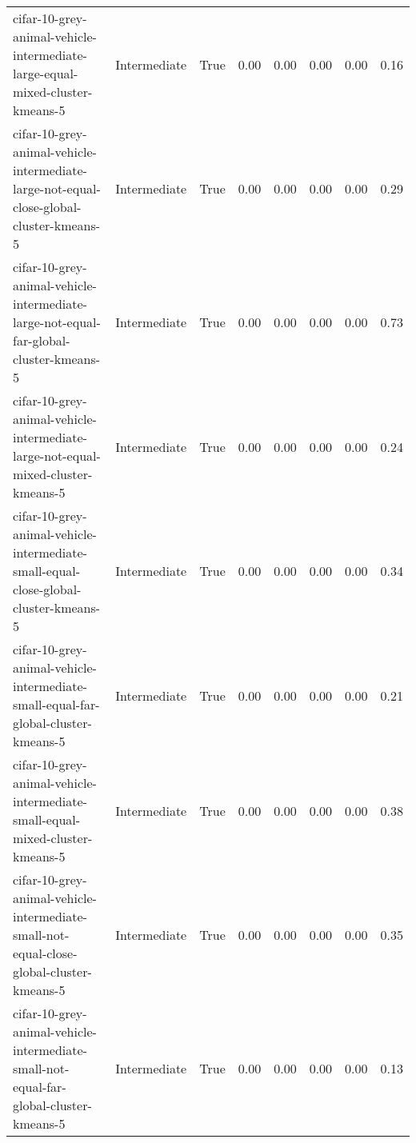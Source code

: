 \begin{longtable}{llllllll}
           cifar-10-grey-animal-vehicle-intermediate-large-equal-mixed-cluster-kmeans-5 & Intermediate &        True &                 0.00 &                 0.00 &                         0.00 &                         0.00 &                         0.16 \\
cifar-10-grey-animal-vehicle-intermediate-large-not-equal-close-global-cluster-kmeans-5 & Intermediate &        True &                 0.00 &                 0.00 &                         0.00 &                         0.00 &                         0.29 \\
  cifar-10-grey-animal-vehicle-intermediate-large-not-equal-far-global-cluster-kmeans-5 & Intermediate &        True &                 0.00 &                 0.00 &                         0.00 &                         0.00 &                         0.73 \\
       cifar-10-grey-animal-vehicle-intermediate-large-not-equal-mixed-cluster-kmeans-5 & Intermediate &        True &                 0.00 &                 0.00 &                         0.00 &                         0.00 &                         0.24 \\
    cifar-10-grey-animal-vehicle-intermediate-small-equal-close-global-cluster-kmeans-5 & Intermediate &        True &                 0.00 &                 0.00 &                         0.00 &                         0.00 &                         0.34 \\
      cifar-10-grey-animal-vehicle-intermediate-small-equal-far-global-cluster-kmeans-5 & Intermediate &        True &                 0.00 &                 0.00 &                         0.00 &                         0.00 &                         0.21 \\
           cifar-10-grey-animal-vehicle-intermediate-small-equal-mixed-cluster-kmeans-5 & Intermediate &        True &                 0.00 &                 0.00 &                         0.00 &                         0.00 &                         0.38 \\
cifar-10-grey-animal-vehicle-intermediate-small-not-equal-close-global-cluster-kmeans-5 & Intermediate &        True &                 0.00 &                 0.00 &                         0.00 &                         0.00 &                         0.35 \\
  cifar-10-grey-animal-vehicle-intermediate-small-not-equal-far-global-cluster-kmeans-5 & Intermediate &        True &                 0.00 &                 0.00 &                         0.00 &                         0.00 &                         0.13 \\

\end{longtable}
